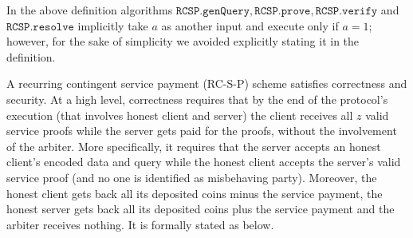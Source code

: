 In the above definition algorithms $\mathtt{RCSP}.\mathtt{genQuery},\mathtt{RCSP}.\mathtt{prove},\mathtt{RCSP}.\mathtt{verify}$ and $\mathtt{RCSP}.\mathtt{resolve}$ implicitly  take $a$ as another input and  execute only if $a=1$; however, for the sake of simplicity we  avoided explicitly stating it  in the definition. 

A recurring contingent service payment (RC-S-P)  scheme satisfies correctness and security. At a high level, correctness requires that by the end of the protocol's execution  (that involves  honest client and server) the client receives all $z$ valid service proofs while the server gets paid  for the proofs, without the involvement of the arbiter. More specifically, it requires that the server accepts an honest client's encoded data and query while the honest client accepts the server's valid service proof (and no one is identified as misbehaving party). Moreover, the honest client gets back all its deposited coins minus the service payment, the honest server gets back all its deposited coins  plus the service payment and the arbiter receives nothing. It is formally stated as below.



